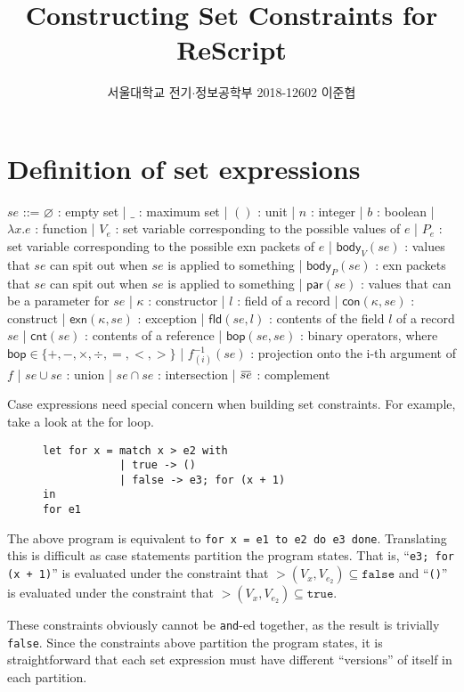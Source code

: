 \documentclass{article}
\title{Constructing Set Constraints for ReScript}
\author{서울대학교 전기$\cdot$정보공학부 2018-12602 이준협}
\date{}
\newcommand{\loverbar}[1]{\mkern 1.5mu\overline{\mkern-1.5mu#1\mkern-1.5mu}\mkern 1.5mu}
\begin{document}
\maketitle
\section{Definition of set expressions}
\begin{bnfgrammar}
  $se$ ::= $\varnothing$ : empty set
  | $\_$ : maximum set
  | $()$ : unit
  | $n$ : integer
  | $b$ : boolean
  | $\lambda x.e$ : function
  | $V_{e}$ : set variable corresponding to the possible values of $e$
  | $P_{e}$ : set variable corresponding to the possible exn packets of $e$
  | $\mathsf{body}_{V}(se)$ : values that $se$ can spit out when $se$ is applied to something
  | $\mathsf{body}_{P}(se)$ : exn packets that $se$ can spit out when $se$ is applied to something
  | $\mathsf{par}(se)$ : values that can be a parameter for $se$
  | $\kappa$ : constructor
  | $l$ : field of a record
  | $\mathsf{con}(\kappa,se)$ : construct
  | $\mathsf{exn}(\kappa,se)$ : exception
  | $\mathsf{fld}(se, l)$ : contents of the field $l$ of a record $se$
  | $\mathsf{cnt}(se)$ : contents of a reference
  | $\mathsf{bop}(se, se)$ : binary operators, where $\mathsf{bop}\in\{+, -, \times, \div, =, <, >\}$
  | $f^{-1}_{(i)}(se)$ : projection onto the i-th argument of $f$
  | $se \cup se$ : union
  | $se \cap se$ : intersection
  | $\loverbar{se}$ : complement
\end{bnfgrammar}

Case expressions need special concern when building set constraints. For example, take a look at the for loop.
\begin{figure}[htb]
\centering
\begin{BVerbatim}
let for x = match x > e2 with
            | true -> ()
            | false -> e3; for (x + 1)
in
for e1
\end{BVerbatim}
\end{figure}

The above program is equivalent to \texttt{for x = e1 to e2 do e3 done}. Translating this is difficult as case statements partition the program states.
That is, ``\texttt{e3; for (x + 1)}'' is evaluated under the constraint that $>(V_{x},V_{e_{2}})\subseteq \mathtt{false}$ and ``\texttt{()}'' is evaluated under the constraint that $>(V_{x}, V_{e_{2}})\subseteq \mathtt{true}$.

These constraints obviously cannot be \texttt{and}-ed together, as the result is trivially \texttt{false}. Since the constraints above partition the program states, it is straightforward that each set expression must have different ``versions'' of itself in each partition.
\end{document}
